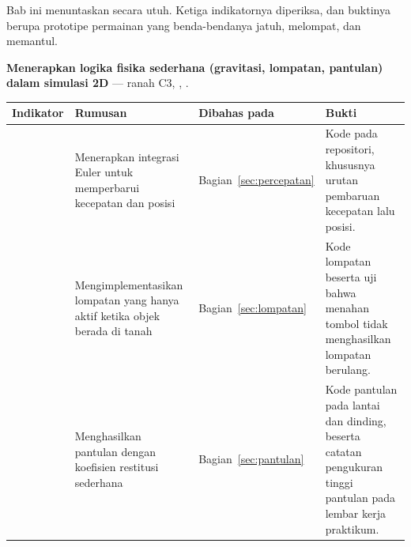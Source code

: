 \begin{subcpmkbox}
Bab ini menuntaskan  secara utuh. Ketiga indikatornya diperiksa,
dan buktinya berupa prototipe permainan yang benda-bendanya jatuh, melompat,
dan memantul.

\vspace{0.5em}
\textbf{ Menerapkan logika fisika sederhana (gravitasi, lompatan,
pantulan) dalam simulasi 2D} --- ranah C3, , .

\vspace{0.5em}
{\setlength{\tabcolsep}{4pt}\footnotesize%
\begin{tabularx}{\textwidth}{@{}C{1.9cm} L{4.0cm} L{2.5cm} Y@{}}
\toprule
\headrow \textbf{Indikator} & \textbf{Rumusan} & \textbf{Dibahas pada} & \textbf{Bukti} \\
\midrule
{} & Menerapkan integrasi Euler untuk memperbarui kecepatan dan posisi &
Bagian~\ref{sec:percepatan} &
Kode  pada repositori, khususnya urutan pembaruan
kecepatan lalu posisi. \\
\addlinespace
{} & Mengimplementasikan lompatan yang hanya aktif ketika objek berada di
tanah &
Bagian~\ref{sec:lompatan} &
Kode lompatan beserta uji bahwa menahan tombol tidak menghasilkan lompatan
berulang. \\
\addlinespace
{} & Menghasilkan pantulan dengan koefisien restitusi sederhana &
Bagian~\ref{sec:pantulan} &
Kode pantulan pada lantai dan dinding, beserta catatan pengukuran tinggi
pantulan pada lembar kerja praktikum. \\
\bottomrule
\end{tabularx}}
\end{subcpmkbox}
